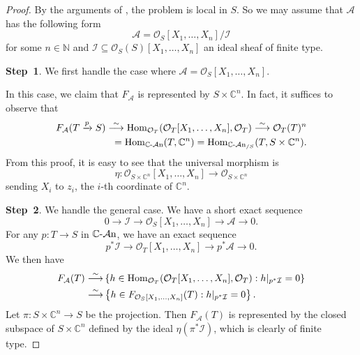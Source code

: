 \begin{proof}
    By the arguments of \cite[\href{https://stacks.math.columbia.edu/tag/01JJ}{Tag 01JJ}]{stacks-project}, the problem is local in $S$. So we may assume that $\mathcal{A}$ has the following form
    \[
        \mathcal{A}=\mathcal{O}_S[X_1,\ldots,X_n]/\mathcal{I}
    \]   
    for some $n\in \mathbb{N}$ and $\mathcal{I}\subseteq \mathcal{O}_S(S)[X_1,\ldots,X_n]$ an ideal sheaf of finite type. 
    
    \textbf{Step~1}. We first handle the case where $\mathcal{A}=\mathcal{O}_S[X_1,\ldots,X_n]$.

    In this case, we claim that $F_{\mathcal{A}}$ is represented by $S\times \mathbb{C}^n$. In fact, it suffices to observe that 
    \[
        \begin{split}
        F_{\mathcal{A}}(T\xrightarrow{p} S)\stackrel{\sim}{\longrightarrow} \operatorname{Hom}_{\mathcal{O}_T}(\mathcal{O}_T[X_1,\ldots,X_n],\mathcal{O}_T)\stackrel{\sim}{\longrightarrow} \mathcal{O}_T(T)^n \\
         = \operatorname{Hom}_{\mathbb{C}\text{-}\mathcal{A}\mathrm{n}}(T,\mathbb{C}^n)=\operatorname{Hom}_{\mathbb{C}\text{-}\mathcal{A}\mathrm{n}_{/S}}(T,S\times \mathbb{C}^n).
        \end{split}
    \]
    From this proof, it is easy to see that the universal morphism is 
    \[
        \eta:\mathcal{O}_{S\times \mathbb{C}^n}[X_1,\ldots,X_n]\rightarrow \mathcal{O}_{S\times \mathbb{C}^n}
    \]
    sending $X_i$ to $z_i$, the $i$-th coordinate of $\mathbb{C}^n$.

    \textbf{Step~2}. We handle the general case.
    We have a short exact sequence
    \[
        0\rightarrow \mathcal{I}\rightarrow \mathcal{O}_S[X_1,\ldots,X_n]\rightarrow \mathcal{A}\rightarrow 0.
    \]    
    For any $p:T\rightarrow S$ in $\mathbb{C}\text{-}\mathcal{A}\mathrm{n}$, we have an exact sequence
    \[
        p^*\mathcal{I}\rightarrow \mathcal{O}_T[X_1,\ldots,X_n]\rightarrow p^*\mathcal{A}\rightarrow 0.
    \]
    We then have
    \[
        \begin{aligned}
        F_{\mathcal{A}}(T)\stackrel{\sim}{\longrightarrow} & \left\{ h\in \operatorname{Hom}_{\mathcal{O}_T}(\mathcal{O}_T[X_1,\ldots,X_n],\mathcal{O}_T): h|_{p^*\mathcal{I}}=0  \right\}\\
        \stackrel{\sim}{\longrightarrow} & \left\{ h\in F_{\mathcal{O}_S[X_1,\ldots,X_n]}(T): h|_{p^*\mathcal{I}}=0  \right\}.
        \end{aligned}
    \]
    Let $\pi:S\times \mathbb{C}^n\rightarrow S$ be the projection. Then $F_{\mathcal{A}}(T)$ is represented by the closed subspace of $S\times \mathbb{C}^n$ defined by the ideal $\eta(\pi^* \mathcal{I})$, which is clearly of finite type.
\end{proof}


